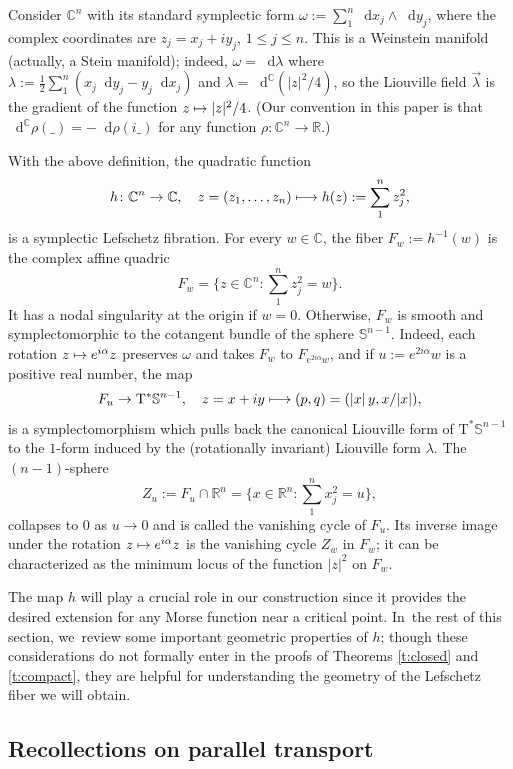\documentclass[JEP,XML,SOM,Unicode]{cedram}
\newcommand\mto{\mathchoice{\longmapsto}{\mapsto}{\mapsto}{\mapsto}}
\newcommand{\C}{{\mathbb C}}
\newcommand{\R}{{\mathbb R}}
\newcommand{\bS}{{\mathbb S}}
\newcommand{\etc}{,\ldots,}
\newcommand{\sT}{\mathrm{T}^\ast}
\renewcommand{\d}{\mathop{}\!\mathrm d}
\newcommand{\dc}{\d^{\scriptscriptstyle{\C}}}
\newcommand{\dlambda}{\d\lambda}
\newcommand{\drho}{\d\rho}
\newcommand{\dx}{\d x}
\newcommand{\dy}{\d y}
\newcommand{\de}{\mathrel{:=}}
\newcommand{\with}{\mathrel{:}}
\let\on\colon
\theoremstyle{plain}
\theoremstyle{definition}
\begin{document}
Consider $\C^n$ with its standard symplectic form $\omega \de \sum_1^n
\dx_j \wedge \dy_j$, where the complex coordinates are $z_j = x_j+iy_j$, $1 \le
j \le n$. This is a Weinstein manifold (actually, a Stein manifold); indeed,
$\omega = \dlambda$ where $\lambda \de \frac12 \sum_1^n (x_j\dy_j - y_j\dx_j)$
and $\lambda = \dc(|z|^2/4)$, so the Liouville field $\vec\lambda$ is the
gradient of the function $z \mto |z|^2/4$. (Our convention in this paper is
that $\dc\rho(\_) = - \drho(i\_)$ for any function $\rho \on \C^n \to \R$.)

With the above definition, the quadratic function
\[
h \on \C^n \to \C, \quad
 z = (z_1 \etc z_n) \mto h(z) \de \sum_1^n z_j^2,
\]
is a symplectic Lefschetz fibration. For every $w \in \C$, the fiber $F_w \de
h^{-1}(w)$ is the complex affine quadric
\[
\textstyle
F_w = \bigl\{z \in \C^n \with \sum_1^n z_j^2 = w\bigr\}.
\]
It has a nodal singularity at the origin if $w=0$. Otherwise, $F_w$ is smooth
and symplectomorphic to the cotangent bundle of the sphere $\bS^{n-1}$. Indeed,
each rotation $z \mto e^{i\alpha} z$ preserves $\omega$ and takes $F_w$ to
$F_{e^{2i\alpha} w}$, and if $u \de e^{2i\alpha} w$ is a positive real number,
the map
\[
F_u \to \sT\bS^{n-1}, \quad
 z = x+iy \mto (p,q) = (|x|\,y, x/|x|),
\]
is a symplectomorphism which pulls back the canonical Liouville form of $\sT
\bS^{n-1}$ to the $1$-form induced by the (rotationally invariant) Liouville
form $\lambda$. The $(n-1)$-sphere
\[
\textstyle 
Z_u \de F_u \cap \R^n = \bigl\{x \in \R^n \with
 \sum_1^n x_j^2 = u\bigr\},
\]
collapses to $0$ as $u \to 0$ and is called the vanishing cycle of $F_u$. Its
inverse image under the rotation $z \mto e^{i\alpha}z$ is the vanishing cycle
$Z_w$ in $F_w$; it can be characterized as the minimum locus of the function
$|z|^2$ on $F_w$.

The map $h$ will play a crucial role in our construction since it provides the
desired extension for any Morse function near a critical point. In~the rest of
this section, we~review some important geometric properties of $h$; though these
considerations do not formally enter in the proofs of Theorems \ref{t:closed}
and \ref{t:compact}, they are helpful for understanding the geometry of the
Lefschetz fiber we will obtain.

\subsection{Recollections on parallel transport} \label{ss:locmod1}
\end{document}
